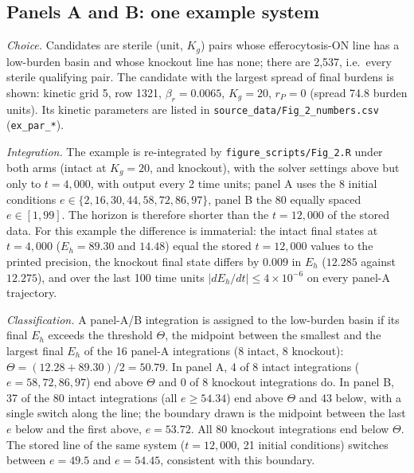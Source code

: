 \documentclass[11pt]{article}
\begin{document}
\subsection{Panels A and B: one example system}
\label{sec:fig1-AB}

\emph{Choice.} Candidates are sterile (unit, $K_g$) pairs whose efferocytosis-ON line has a
low-burden basin and whose knockout line has none; there are 2{,}537, i.e.\ every
sterile qualifying pair.
The candidate with the largest spread of final burdens is shown: kinetic grid 5,
row 1321, $\beta_r = 0.0065$, $K_g = 20$, $r_P = 0$ (spread 74.8 burden units).
Its kinetic parameters are listed in \texttt{source\_data/Fig\_2\_numbers.csv}
(\texttt{ex\_par\_*}).

\emph{Integration.} The example is re-integrated by \texttt{figure\_scripts/Fig\_2.R} under
both arms (intact at $K_g = 20$, and knockout), with the solver settings above but
only to $t = 4{,}000$, with output every 2 time units; panel A uses the 8 initial
conditions $e \in \{2, 16, 30, 44, 58, 72, 86, 97\}$, panel B the 80 equally spaced
$e \in [1, 99]$. The horizon is therefore shorter than the $t = 12{,}000$ of the stored
data. For this example the difference is immaterial: the intact final states at
$t = 4{,}000$ ($E_h = 89.30$ and $14.48$) equal the stored $t = 12{,}000$ values to
the printed precision, the knockout final state differs by $0.009$ in $E_h$
($12.285$ against $12.275$), and over the last 100 time units $|dE_h/dt| \le 4\times10^{-6}$
on every panel-A trajectory.

\emph{Classification.} A panel-A/B integration is assigned to the low-burden basin
if its final $E_h$ exceeds the threshold $\Theta$, the midpoint between the smallest
and the largest final $E_h$ of the 16 panel-A integrations (8 intact, 8 knockout):
$\Theta = (12.28 + 89.30)/2 = 50.79$.
In panel A, 4 of 8 intact integrations ($e = 58, 72, 86, 97$) end above $\Theta$ and
0 of 8 knockout integrations do. In panel B, 37 of the 80 intact integrations
(all $e \ge 54.34$) end above $\Theta$ and 43 below, with a single switch along the line;
the boundary drawn is the midpoint between the last $e$ below and the first above,
$e = 53.72$. All 80 knockout integrations end below $\Theta$.
The stored line of the same system ($t = 12{,}000$, 21 initial conditions) switches
between $e = 49.5$ and $e = 54.45$, consistent with this boundary.
\end{document}
